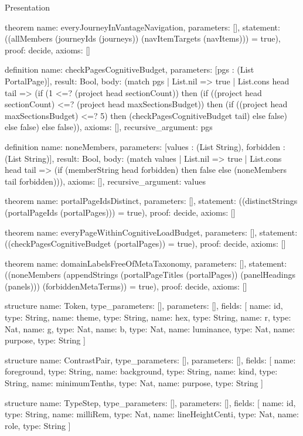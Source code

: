 \begin{lexlean}{Presentation}
\begin{semanticmodule}
theorem{
  name: everyJourneyInVantageNavigation,
  parameters: [],
  statement: ((allMembers (journeyIds (journeys)) (navItemTargets (navItems))) = true),
  proof: decide{},
  axioms: []
}

definition{
  name: checkPagesCognitiveBudget,
  parameters: [pgs : (List PortalPage)],
  result: Bool,
  body: (match pgs
    | List.nil => true
    | List.cons head tail => (if (1 <=? (project head sectionCount)) then (if ((project head sectionCount) <=? (project head maxSectionsBudget)) then (if ((project head maxSectionsBudget) <=? 5) then (checkPagesCognitiveBudget tail) else false) else false) else false)),
  axioms: [],
  recursive_argument: pgs
}

definition{
  name: noneMembers,
  parameters: [values : (List String), forbidden : (List String)],
  result: Bool,
  body: (match values
    | List.nil => true
    | List.cons head tail => (if (memberString head forbidden) then false else (noneMembers tail forbidden))),
  axioms: [],
  recursive_argument: values
}

theorem{
  name: portalPageIdsDistinct,
  parameters: [],
  statement: ((distinctStrings (portalPageIds (portalPages))) = true),
  proof: decide{},
  axioms: []
}

theorem{
  name: everyPageWithinCognitiveLoadBudget,
  parameters: [],
  statement: ((checkPagesCognitiveBudget (portalPages)) = true),
  proof: decide{},
  axioms: []
}

theorem{
  name: domainLabelsFreeOfMetaTaxonomy,
  parameters: [],
  statement: ((noneMembers (appendStrings (portalPageTitles (portalPages)) (panelHeadings (panels))) (forbiddenMetaTerms)) = true),
  proof: decide{},
  axioms: []
}

structure{
  name: Token,
  type_parameters: [],
  parameters: [],
  fields: [
    {name: id, type: String},
    {name: theme, type: String},
    {name: hex, type: String},
    {name: r, type: Nat},
    {name: g, type: Nat},
    {name: b, type: Nat},
    {name: luminance, type: Nat},
    {name: purpose, type: String}
  ]
}

structure{
  name: ContrastPair,
  type_parameters: [],
  parameters: [],
  fields: [
    {name: foreground, type: String},
    {name: background, type: String},
    {name: kind, type: String},
    {name: minimumTenths, type: Nat},
    {name: purpose, type: String}
  ]
}

structure{
  name: TypeStep,
  type_parameters: [],
  parameters: [],
  fields: [
    {name: id, type: String},
    {name: milliRem, type: Nat},
    {name: lineHeightCenti, type: Nat},
    {name: role, type: String}
  ]
}


\end{semanticmodule}
\end{lexlean}
